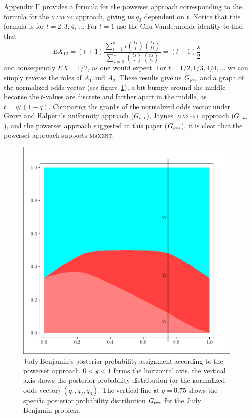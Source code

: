 \documentclass[12pt]{article}
\def\lwv{.6}
\begin{document}
Appendix II provides a formula for the powerset approach corresponding
to the formula for the \textsc{maxent} approach, giving us $q_{3}$
dependent on $t$. Notice that this formula is for $t=2,3,4,\ldots$.
For $t=1$ use the Chu-Vandermonde identity to find that
\begin{displaymath}
  EX_{12}=(t+1)\frac{\sum_{i=1}^{s}i\binom{ts}{i}\binom{ts}{ti}}{\sum_{i=0}^{s}\binom{ts}{i}\binom{ts}{ti}}=(t+1)\frac{s}{2}  
\end{displaymath}
and consequently $EX=1/2$, as one would expect. For
$t=1/2,1/3,1/4,\ldots$ we can simply reverse the roles of $A_{1}$ and
$A_{2}$. These results give us $G_{\mbox{\tiny pws}}$ and a graph of
the normalized odds vector (see figure~\ref{fig:pwst}), a bit bumpy
around the middle because the $t$-values are discrete and farther
apart in the middle, as $t=q/(1-q)$. Comparing the graphs of the
normalized odds vector under Grove and Halpern's uniformity approach
($G_{\mbox{\tiny ind}}$), Jaynes' \textsc{maxent} approach
($G_{\mbox{\tiny max}}$), and the powerset approach suggested in this
paper ($G_{\mbox{\tiny pws}}$), it is clear that the powerset approach
supports \textsc{maxent}.

\begin{figure}[h]
  \begin{flushright}
    \begin{minipage}[h]{\lwv\linewidth}
      \includegraphics[width=\textwidth]{zeroone-pwst.pdf}
      \caption{Judy Benjamin's posterior probability assignment
        according to the powerset approach. $0<q<1$ forms the
        horizontal axis, the vertical axis shows the posterior
        probability distribution (or the normalized odds vector)
        $(q_{1},q_{2},q_{3})$. The vertical line at $q=0.75$ shows the
        specific posterior probability distribution $G_{\mbox{\tiny
            pws}}$ for the Judy Benjamin problem.}
      \label{fig:pwst}
    \end{minipage}
  \end{flushright}
\end{figure}
\end{document}
